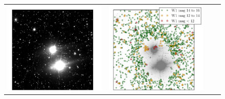 \documentclass[12pt,preprint]{aastex}
\begin{document}
\begin{figure}
\begin{center}
\begin{tabular}{@{}c@{\spc}c@{\spc}c@{\spc}c@{}}
      \includegraphics[width=\figw]{bright-02} &
      \includegraphics[width=\figw]{bright-03} \\

\end{tabular}
\end{center}
\end{figure}
\end{document}
